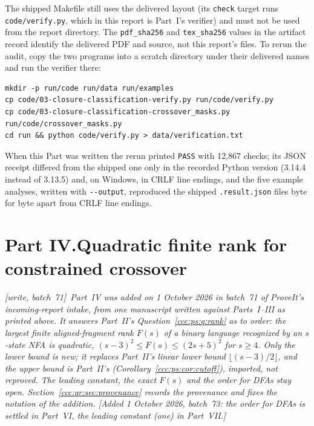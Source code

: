 \documentclass[11pt,letterpaper]{article}
\theoremstyle{definition}
\theoremstyle{remark}
\newcommand{\wsevone}{\textup{[write, batch~71]}}
\newcommand{\waddsevthree}[1]{\textup{[}Added 1 October 2026, batch~73: #1\textup{]}}
\begin{document}
The shipped Makefile still uses the delivered layout (its \texttt{check}
target runs \texttt{code/verify.py}, which in this report is Part~I's
verifier) and must not be used from the report directory. The
\texttt{pdf\_sha256} and \texttt{tex\_sha256} values in the artifact record
identify the delivered PDF and source, not this report's files. To rerun the
audit, copy the two programs into a scratch directory under their delivered
names and run the verifier there:
\begin{lstlisting}
mkdir -p run/code run/data run/examples
cp code/03-closure-classification-verify.py run/code/verify.py
cp code/03-closure-classification-crossover_masks.py run/code/crossover_masks.py
cd run && python code/verify.py > data/verification.txt
\end{lstlisting}
When this Part was written the rerun printed \texttt{PASS} with 12,867
checks; its JSON receipt differed from the shipped one only in the recorded
Python version (3.14.4 instead of 3.13.5) and, on Windows, in CRLF line
endings, and the five example analyses, written with \texttt{-{}-output},
reproduced the shipped \texttt{.result.json} files byte for byte apart from
CRLF line endings.

\clearpage
{}\part*{Part IV.\quad Quadratic finite rank for constrained crossover}

\noindent\emph{\wsevone\ Part~IV was added on 1 October 2026 in batch~71 of
ProveIt's incoming-report intake, from one manuscript written against
Parts~I--III as printed above. It answers Part~II's
Question~\ref{ccc:ps:q:rank} as to order: the largest finite aligned-fragment
rank $F(s)$ of a binary language recognized by an $s$-state NFA is quadratic,
$(s-3)^2\le F(s)\le(2s+5)^2$ for $s\ge4$. Only the lower bound is new; it
replaces Part~II's linear lower bound $\lfloor(s-3)/2\rfloor$, and the upper
bound is Part~II's (Corollary~\ref{ccc:ps:cor:cutoff}), imported, not
reproved. The leading constant, the exact $F(s)$ and the order for DFAs stay
open. Section~\ref{ccc:qr:sec:provenance} records the provenance and fixes
the notation of the addition.
\waddsevthree{the order for DFAs is settled in Part~VI, the leading
constant (one) in Part~VII.}}
\end{document}
